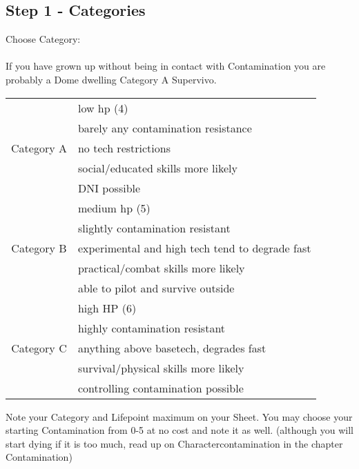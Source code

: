 \documentclass{article}
\begin{document}
    \subsection{Step 1 - Categories}

    Choose Category:\\\\
    If you have grown up without being in contact with Contamination you are probably a Dome dwelling Category A Supervivo. \\
    \begin{tabular}{c|l}
        & low hp (4)\\
        & barely any contamination resistance\\
        Category A     & no tech restrictions\\
        & social/educated skills more likely\\
        & DNI possible\\\hline
        & medium hp (5)\\
        & slightly contamination resistant\\
        Category B    & experimental and high tech tend to degrade fast\\
        & practical/combat skills more likely\\
        & able to pilot and survive outside\\\hline
        & high HP (6) \\
        & highly contamination resistant \\
        Category C & anything above basetech, degrades fast\\
        & survival/physical skills more likely\\
        & controlling contamination possible
    \end{tabular}\newline


    \par

    Note your Category and Lifepoint maximum on your Sheet. You may choose your starting Contamination from 0-5 at no cost and note
    it as well. (although you will start dying if it is too much, read up on Charactercontamination in the chapter Contamination)\\
\end{document}
